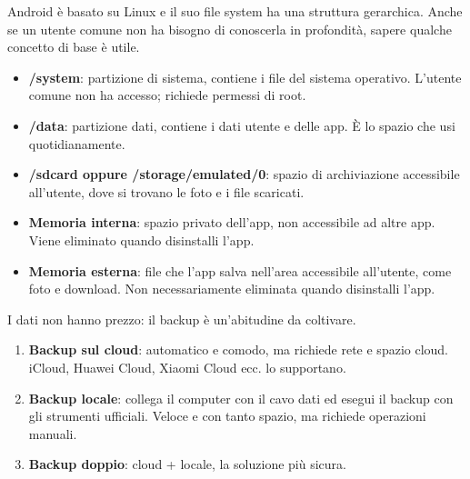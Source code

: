 
Android è basato su Linux e il suo file system ha una struttura gerarchica. Anche se un utente comune non ha bisogno di conoscerla in profondità, sapere qualche concetto di base è utile.


\begin{itemize}
  \item \textbf{/system}: partizione di sistema, contiene i file del sistema operativo. L'utente comune non ha accesso; richiede permessi di root.
  \item \textbf{/data}: partizione dati, contiene i dati utente e delle app. È lo spazio che usi quotidianamente.
  \item \textbf{/sdcard oppure /storage/emulated/0}: spazio di archiviazione accessibile all'utente, dove si trovano le foto e i file scaricati.
\end{itemize}


\begin{itemize}
  \item \textbf{Memoria interna}: spazio privato dell'app, non accessibile ad altre app. Viene eliminato quando disinstalli l'app.
  \item \textbf{Memoria esterna}: file che l'app salva nell'area accessibile all'utente, come foto e download. Non necessariamente eliminata quando disinstalli l'app.
\end{itemize}


I dati non hanno prezzo: il backup è un'abitudine da coltivare.


\begin{enumerate}
  \item \textbf{Backup sul cloud}: automatico e comodo, ma richiede rete e spazio cloud. iCloud, Huawei Cloud, Xiaomi Cloud ecc. lo supportano.
  \item \textbf{Backup locale}: collega il computer con il cavo dati ed esegui il backup con gli strumenti ufficiali. Veloce e con tanto spazio, ma richiede operazioni manuali.
  \item \textbf{Backup doppio}: cloud + locale, la soluzione più sicura.
\end{enumerate}

